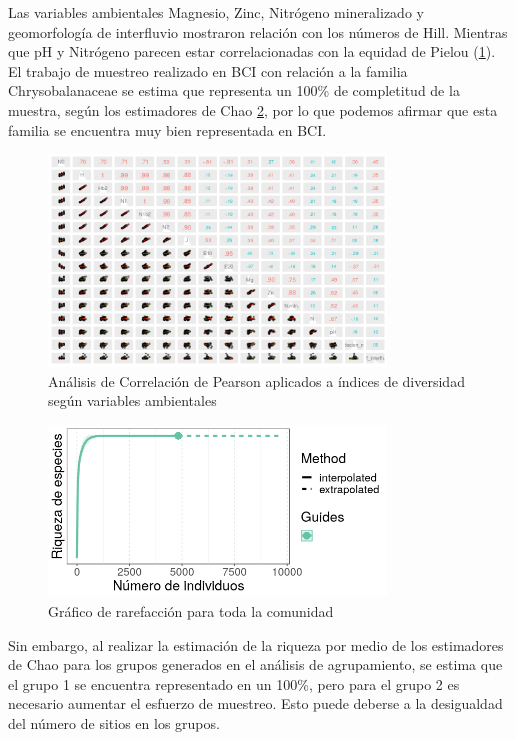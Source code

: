 \documentclass[11pt,]{article}
\begin{document}
Las variables ambientales Magnesio, Zinc, Nitrógeno mineralizado y
geomorfología de interfluvio mostraron relación con los números de Hill.
Mientras que pH y Nitrógeno parecen estar correlacionadas con la equidad
de Pielou (\ref{diversidadalpha}). El trabajo de muestreo realizado en
BCI con relación a la familia Chrysobalanaceae se estima que representa
un 100\% de completitud de la muestra, según los estimadores de Chao
\ref{extrapolacion}, por lo que podemos afirmar que esta familia se
encuentra muy bien representada en BCI.

\begin{figure}
\centering
\includegraphics[width=0.80000\textwidth]{diversidadalpha.png}
\caption{Análisis de Correlación de Pearson aplicados a índices de
diversidad según variables ambientales\label{diversidadalpha}}
\end{figure}

\begin{figure}
\centering
\includegraphics[width=0.80000\textwidth]{Extrapolacion_mifamilia.png}
\caption{Gráfico de rarefacción para toda la
comunidad\label{extrapolacion}}
\end{figure}

Sin embargo, al realizar la estimación de la riqueza por medio de los
estimadores de Chao para los grupos generados en el análisis de
agrupamiento, se estima que el grupo 1 se encuentra representado en un
100\%, pero para el grupo 2 es necesario aumentar el esfuerzo de
muestreo. Esto puede deberse a la desigualdad del número de sitios en
los grupos.
\end{document}
